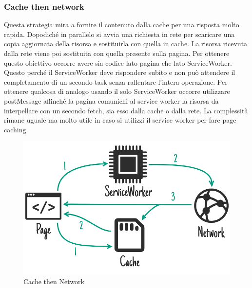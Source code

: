 \documentclass[11pt ,a4paper , twoside , openright ]{article}
\begin{document}
\subsubsection{Cache then network}
Questa strategia mira a fornire il contenuto dalla cache per una risposta molto rapida. Dopodiché in parallelo si avvia una richiesta in rete per scaricare una copia aggiornata della risorsa e sostituirla con quella in cache. La risorsa ricevuta dalla rete viene poi sostituita con quella presente sulla pagina.
Per ottenere questo obiettivo occorre avere sia codice lato pagina che lato ServiceWorker. Questo perché il ServiceWorker deve rispondere subito e non può attendere il completamento di un secondo task senza rallentare l’intera operazione.
Per ottenere qualcosa di analogo usando il solo ServiceWorker occorre utilizzare postMessage affinché la pagina comunichi al service worker la risorsa da interpellare con un secondo fetch, sia esso dalla cache o dalla rete. La complessità rimane uguale ma molto utile in caso si utilizzi il service worker per fare page caching.
\begin{figure}[h]
	\centering
	\includegraphics[width=0.7\linewidth]{Strategia6}
	\caption{Cache then Network}
	\label{fig: Cache then Network}
\end{figure}
\newpage
\end{document}
